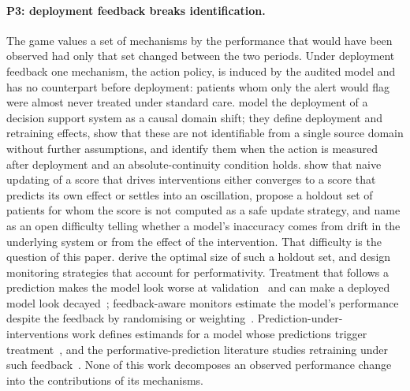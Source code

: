 \documentclass[letterpaper]{article} %
\begin{document}
\paragraph{P3: deployment feedback breaks identification.} The game values a
set of mechanisms by the performance that would have been observed had only
that set changed between the two periods. Under deployment feedback one
mechanism, the action policy, is induced by the audited model and has no
counterpart before deployment: patients whom only the alert would flag were
almost never treated under standard care. \citet{boeken2024evaluating} model
the deployment of a decision support system as a causal domain shift; they
define deployment and retraining effects, show that these are not identifiable
from a single source domain without further assumptions, and identify them
when the action is measured after deployment and an absolute-continuity
condition holds. \citet{liley2021model} show that naive updating of a score
that drives interventions either converges to a score that predicts its own
effect or settles into an oscillation, propose a holdout set of patients for
whom the score is not computed as a safe update strategy, and name as an open
difficulty telling whether a model's inaccuracy comes from drift in the
underlying system or from the effect of the intervention. That difficulty is
the question of this paper. \citet{haidarwehbe2025holdout} derive the optimal
size of such a holdout set, and \citet{feng2024designing} design monitoring
strategies that account for performativity. Treatment that follows a prediction
makes the model look worse at validation~\citep{pajouheshnia2017accounting}
and can make a deployed model look decayed~\citep{ansari2025challenges};
feedback-aware monitors estimate the model's performance despite the feedback
by randomising or weighting~\citep{corbin2023avoiding, kim2025monitoring}.
Prediction-under-interventions work
defines estimands for a model whose predictions trigger
treatment~\citep{sperrin2018msm, vangeloven2020prediction,
keogh2024prediction, luijken2024estimands}, and the performative-prediction
literature studies retraining under such feedback~\citep{perdomo2020performative,
kabra2024limitations, lee2026partially}. None of this work decomposes an
observed performance change into the contributions of its mechanisms.
\end{document}
